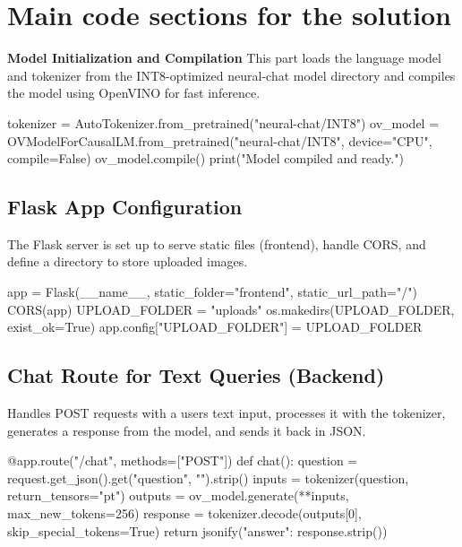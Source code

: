 \documentclass{josis}
\begin{document}
\section{Main code sections for the solution}
\textbf{Model Initialization and Compilation}
 This part loads the language model and tokenizer from the INT8-optimized neural-chat model directory and compiles the model using OpenVINO for fast inference.


 
\begin{python}
tokenizer = AutoTokenizer.from_pretrained("neural-chat/INT8")
ov_model = OVModelForCausalLM.from_pretrained("neural-chat/INT8", device="CPU", compile=False)
ov_model.compile()
print("Model compiled and ready.")

\end{python}
\subsection{Flask App Configuration }
The Flask server is set up to serve static files (frontend), handle CORS, and define a directory to store uploaded images. 
\begin{python}
app = Flask(__name__, static_folder="frontend", static_url_path="/")
CORS(app)
UPLOAD_FOLDER = "uploads"
os.makedirs(UPLOAD_FOLDER, exist_ok=True)
app.config["UPLOAD_FOLDER"] = UPLOAD_FOLDER

\end{python}
\subsection{Chat Route for Text Queries (Backend) }
Handles POST requests with a users text input, processes it with the tokenizer, generates a response from the model, and sends it back in JSON.

 
\begin{python}
@app.route("/chat", methods=["POST"])
def chat():
    question = request.get_json().get("question", "").strip()
    inputs = tokenizer(question, return_tensors="pt")
    outputs = ov_model.generate(**inputs, max_new_tokens=256)
    response = tokenizer.decode(outputs[0], skip_special_tokens=True)
    return jsonify({"answer": response.strip()})

\end{python}
\end{document}
